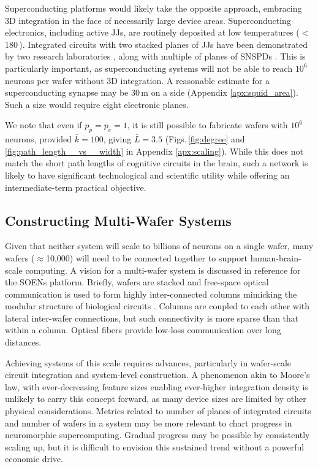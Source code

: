 \documentclass[twocolumn]{article}
\begin{document}
Superconducting platforms would likely take the opposite approach, embracing 3D integration in the face of necessarily large device areas. Superconducting electronics, including active JJs, are routinely deposited at low temperatures ($<$\,180\,\textcelsius). Integrated circuits with two stacked planes of JJs have been demonstrated by two research laboratories \cite{tobo2019,anna2017}, along with multiple of planes of SNSPDs \cite{vema2012}. This is particularly important, as superconducting systems will not be able to reach $10^6$ neurons per wafer without 3D integration. A reasonable estimate for a superconducting synapse may be 30\,\textmu m on a side (Appendix \ref{apx:squid_area}). Such a size would require eight electronic planes. 

We note that even if $p_p = p_e = 1$, it is still possible to fabricate wafers with $10^6$ neurons, provided $\bar{k} = 100$, giving $\bar{L} = 3.5$ (Figs.\,\ref{fig:degree} and \ref{fig:path_length__vs__width} in Appendix \ref{apx:scaling}). While this does not match the short path lengths of cognitive circuits in the brain, such a network is likely to have significant technological and scientific utility while offering an intermediate-term practical objective.

\subsection{Constructing Multi-Wafer Systems}
Given that neither system will scale to billions of neurons on a single wafer, many wafers ($\approx$10,000) will need to be connected together to support human-brain-scale computing. A vision for a multi-wafer system is discussed in reference \cite{shainline2020optoelectronic} for the SOENs platform. Briefly, wafers are stacked and free-space optical communication is used to form highly inter-connected columns mimicking the modular structure of biological circuits \cite{mo1978,mo1997,mela2010,bosp2015,beba2017}. Columns are coupled to each other with lateral inter-wafer connections, but such connectivity is more sparse than that within a column. Optical fibers provide low-loss communication over long distances.

Achieving systems of this scale requires advances, particularly in wafer-scale circuit integration and system-level construction. A phenomenon akin to Moore's law, with ever-decreasing feature sizes enabling ever-higher integration density is unlikely to carry this concept forward, as many device sizes are limited by other physical considerations. Metrics related to number of planes of integrated circuits and number of wafers in a system may be more relevant to chart progress in neuromorphic supercomputing. Gradual progress may be possible by consistently scaling up, but it is difficult to envision this sustained trend without a powerful economic drive.  
\end{document}
